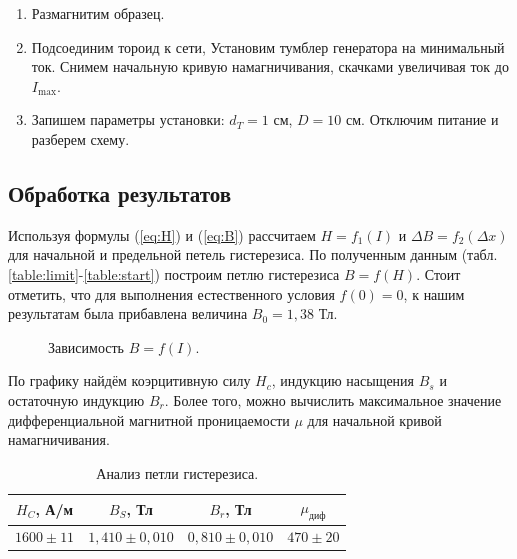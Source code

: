 \documentclass[a4paper,12pt]{article}
\begin{document}
\begin{enumerate}[resume]
    \item Размагнитим образец.
    \item Подсоединим тороид к сети, Установим тумблер генератора на минимальный ток. Снимем начальную кривую намагничивания, скачками увеличивая ток до $I_\text{max}$.
    \item Запишем параметры установки: $d_T = 1$ см, $D = 10$ см. Отключим питание и разберем схему.
\end{enumerate}

\subsection{Обработка результатов}

Используя формулы (\ref{eq:H}) и (\ref{eq:B}) рассчитаем $H = f_1(I)$ и $\Delta B = f_2 (\Delta x)$ для начальной и предельной петель гистерезиса. По полученным данным (табл.\ref{table:limit}-\ref{table:start}) построим петлю гистерезиса $B = f (H)$. Стоит отметить, что для выполнения естественного условия $f(0) = 0$, к нашим результатам была прибавлена величина $B_0 = 1,38$ Тл. 

\begin{figure}[H]
    \caption{Зависимость $B = f(I)$.}
    \label{ris:B=f(I)}
\end{figure}


По графику найдём коэрцитивную силу $H_c$, индукцию насыщения $B_s$ и остаточную индукцию $B_r$. Более того, можно вычислить максимальное значение дифференциальной магнитной проницаемости $\mu$ для начальной кривой намагничивания.

\begin{table}[H]
    \caption{Анализ петли гистерезиса.}
    \label{table:result}
    \begin{tabular}{|c|c|c|c|}
        \hline
        $H_C$, А/м   & $B_S$, Тл         & $B_r$, Тл    & $\mu_{диф}$  \\ \hline
        $1600\pm 11$ & $1,410 \pm 0,010$ & $0,810\pm 0,010$ & $470 \pm 20$ \\ \hline
    \end{tabular}
\end{table}
\end{document}

